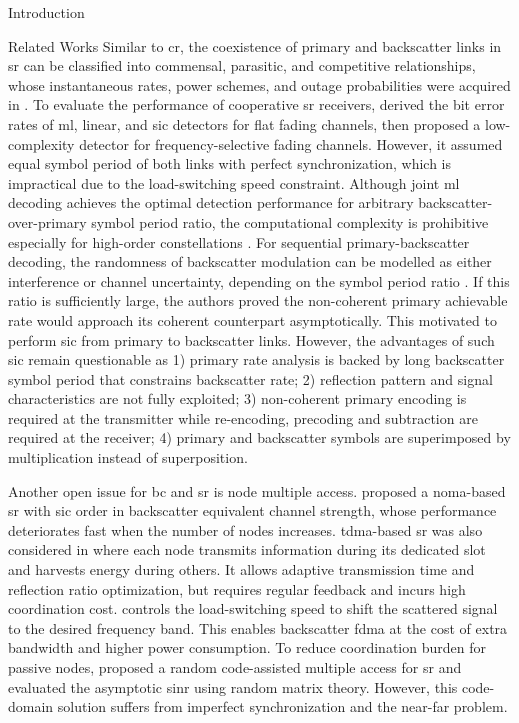 \documentclass[journal]{IEEEtran}
\begin{document}
\begin{section}{Introduction}
	\begin{subsection}{Related Works}
		Similar to \gls{cr}, the coexistence of primary and backscatter links in \gls{sr} can be classified into commensal, parasitic, and competitive relationships, whose instantaneous rates, power schemes, and outage probabilities were acquired in \cite{Guo2019b,Ding2020}.
		To evaluate the performance of cooperative \gls{sr} receivers, \cite{Yang2018} derived the bit error rates of \gls{ml}, linear, and \gls{sic} detectors for flat fading channels, then proposed a low-complexity detector for frequency-selective fading channels.
		However, it assumed equal symbol period of both links with perfect synchronization, which is impractical due to the load-switching speed constraint.
		Although joint \gls{ml} decoding achieves the optimal detection performance for arbitrary backscatter-over-primary symbol period ratio, the computational complexity is prohibitive especially for high-order constellations \cite{Yang2018,Liang2020,Zhang2022}.
		For sequential primary-backscatter decoding, the randomness of backscatter modulation can be modelled as either interference or channel uncertainty, depending on the symbol period ratio \cite{Long2020a}.
		If this ratio is sufficiently large, the authors proved the non-coherent primary achievable rate would approach its coherent counterpart asymptotically.
		This motivated \cite{Long2020a,Liang2020,Guo2019b,Ding2020,Zhou2019a,Wu2021a,Xu2021a,Yang2021a,Yang2018,Han2021,Zhang2022} to perform \gls{sic} from primary to backscatter links.
		However, the advantages of such \gls{sic} remain questionable as
		1) primary rate analysis is backed by long backscatter symbol period that constrains backscatter rate;
		2) reflection pattern and signal characteristics are not fully exploited;
		3) non-coherent primary encoding is required at the transmitter while re-encoding, precoding and subtraction are required at the receiver;
		4) primary and backscatter symbols are superimposed by multiplication instead of superposition.

		Another open issue for \gls{bc} and \gls{sr} is node multiple access.
		\cite{Xu2021a} proposed a \gls{noma}-based \gls{sr} with \gls{sic} order in backscatter equivalent channel strength, whose performance deteriorates fast when the number of nodes increases.
		\gls{tdma}-based \gls{sr} was also considered in \cite{Yang2021a} where each node transmits information during its dedicated slot and harvests energy during others.
		It allows adaptive transmission time and reflection ratio optimization, but requires regular feedback and incurs high coordination cost.
		\cite{Vougioukas2019} controls the load-switching speed to shift the scattered signal to the desired frequency band.
		This enables backscatter \gls{fdma} at the cost of extra bandwidth and higher power consumption.
		To reduce coordination burden for passive nodes, \cite{Han2021} proposed a random code-assisted multiple access for \gls{sr} and evaluated the asymptotic \gls{sinr} using random matrix theory.
		However, this code-domain solution suffers from imperfect synchronization and the near-far problem.


\end{subsection}
\end{section}
\end{document}
